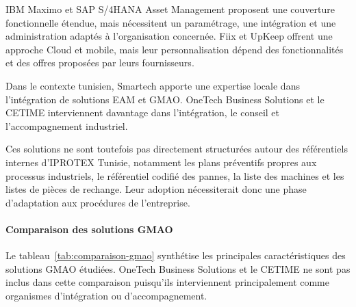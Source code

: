 IBM Maximo et SAP S/4HANA Asset Management proposent une couverture fonctionnelle étendue, mais nécessitent un paramétrage, une intégration et une administration adaptés à l’organisation concernée. Fiix et UpKeep offrent une approche Cloud et mobile, mais leur personnalisation dépend des fonctionnalités et des offres proposées par leurs fournisseurs.

Dans le contexte tunisien, Smartech apporte une expertise locale dans l’intégration de solutions EAM et GMAO. OneTech Business Solutions et le CETIME interviennent davantage dans l’intégration, le conseil et l’accompagnement industriel.

Ces solutions ne sont toutefois pas directement structurées autour des référentiels internes d’IPROTEX Tunisie, notamment les plans préventifs propres aux processus industriels, le référentiel codifié des pannes, la liste des machines et les listes de pièces de rechange. Leur adoption nécessiterait donc une phase d’adaptation aux procédures de l’entreprise.

\paragraph{Comparaison des solutions GMAO}

Le tableau~\ref{tab:comparaison-gmao} synthétise les principales caractéristiques des solutions GMAO étudiées. OneTech Business Solutions et le CETIME ne sont pas inclus dans cette comparaison puisqu’ils interviennent principalement comme organismes d’intégration ou d’accompagnement.

